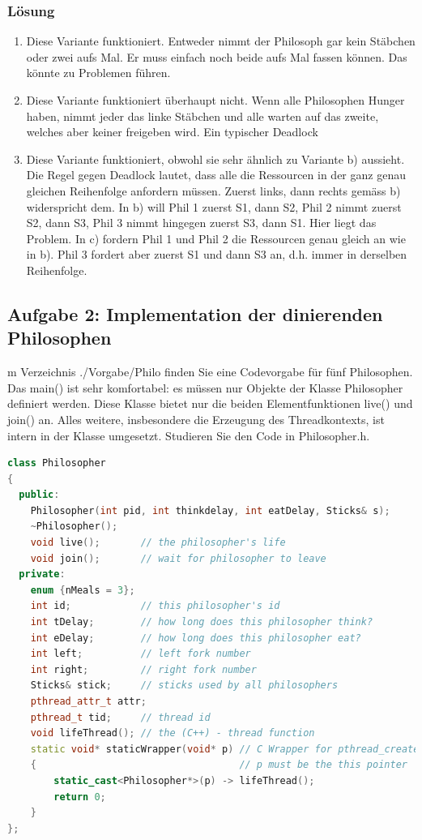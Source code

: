 \subsubsection{Lösung}

\begin{enumerate}
  \item Diese Variante funktioniert. Entweder nimmt der Philosoph gar kein Stäbchen oder zwei aufs Mal. Er muss einfach noch beide aufs Mal fassen können. Das könnte zu Problemen führen.
  \item Diese Variante funktioniert überhaupt nicht. Wenn alle Philosophen Hunger haben, nimmt jeder das linke Stäbchen und alle warten auf das zweite, welches aber keiner freigeben wird. Ein typischer Deadlock
  \item Diese Variante funktioniert, obwohl sie sehr ähnlich zu Variante b) aussieht. Die Regel gegen Deadlock lautet, dass alle die Ressourcen in der ganz genau gleichen Reihenfolge anfordern müssen. Zuerst links, dann rechts gemäss b) widerspricht dem. In b) will Phil 1 zuerst S1, dann S2, Phil 2 nimmt zuerst S2, dann S3, Phil 3 nimmt hingegen zuerst S3, dann S1. Hier liegt das Problem. In c) fordern Phil 1 und Phil 2 die Ressourcen genau gleich an wie in b). Phil 3 fordert aber zuerst S1 und dann S3 an, d.h. immer in derselben Reihenfolge.
\end{enumerate}

\subsection{Aufgabe 2: Implementation der dinierenden Philosophen}

m Verzeichnis ./Vorgabe/Philo finden Sie eine Codevorgabe für fünf Philosophen. Das main() ist sehr komfortabel: es müssen nur Objekte der Klasse Philosopher definiert werden. Diese Klasse bietet nur die beiden Elementfunktionen live() und join() an. Alles weitere, insbesondere die Erzeugung des Threadkontexts, ist intern in der Klasse umgesetzt. Studieren Sie den Code in Philosopher.h.

\begin{lstlisting}[language=C++, style=C++]
class Philosopher
{
  public:
    Philosopher(int pid, int thinkdelay, int eatDelay, Sticks& s);
    ~Philosopher();
    void live();       // the philosopher's life
    void join();       // wait for philosopher to leave
  private:
    enum {nMeals = 3};
    int id;            // this philosopher's id
    int tDelay;        // how long does this philosopher think?
    int eDelay;        // how long does this philosopher eat?
    int left;          // left fork number
    int right;         // right fork number
    Sticks& stick;     // sticks used by all philosophers
    pthread_attr_t attr;
    pthread_t tid;     // thread id
    void lifeThread(); // the (C++) - thread function
    static void* staticWrapper(void* p) // C Wrapper for pthread_create()
    {                                   // p must be the this pointer
        static_cast<Philosopher*>(p) -> lifeThread();
        return 0;
    }
};
\end{lstlisting}

